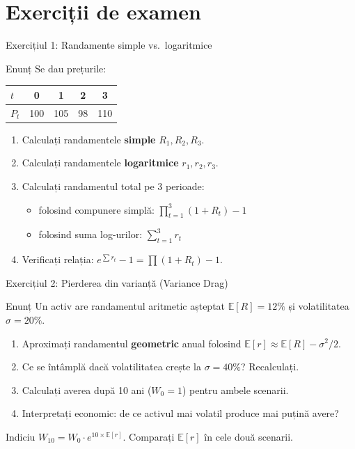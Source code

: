 \documentclass[9pt, aspectratio=169, t]{beamer}
\theoremstyle{definition}
\newcommand{\E}{\mathbb{E}}
\begin{document}
\section{Exerciții de examen}

\begin{frame}{Exercițiul 1: Randamente simple vs.\ logaritmice}
\begin{block}{Enunț}
Se dau prețurile:
\begin{center}
{\small
\renewcommand{\arraystretch}{1.2}
\begin{tabular}{lcccc}
\toprule
$t$ & 0 & 1 & 2 & 3 \\
\midrule
$P_t$ & 100 & 105 & 98 & 110 \\
\bottomrule
\end{tabular}
}
\end{center}
\end{block}
\begin{enumerate}
    \item Calculați randamentele \textbf{simple} $R_1, R_2, R_3$.
    \item Calculați randamentele \textbf{logaritmice} $r_1, r_2, r_3$.
    \item Calculați randamentul total pe 3 perioade:
    \begin{itemize}
        \item folosind compunere simplă: $\prod_{t=1}^{3}(1+R_t) - 1$
        \item folosind suma log-urilor: $\sum_{t=1}^{3} r_t$
    \end{itemize}
    \item Verificați relația: $e^{\sum r_t} - 1 = \prod(1+R_t) - 1$.
\end{enumerate}
\end{frame}

\begin{frame}{Exercițiul 2: Pierderea din varianță (Variance Drag)}
\begin{block}{Enunț}
Un activ are randamentul aritmetic așteptat $\E[R] = 12\%$ și volatilitatea $\sigma = 20\%$.
\end{block}
\begin{enumerate}
    \item Aproximați randamentul \textbf{geometric} anual folosind $\E[r] \approx \E[R] - \sigma^2/2$.
    \item Ce se întâmplă dacă volatilitatea crește la $\sigma = 40\%$? Recalculați.
    \item Calculați averea după 10 ani ($W_0 = 1$) pentru ambele scenarii.
    \item Interpretați economic: de ce activul mai volatil produce mai puțină avere?
\end{enumerate}
\vspace{0.1cm}
\begin{exampleblock}{Indiciu}
$W_{10} = W_0 \cdot e^{10 \times \E[r]}$. Comparați $\E[r]$ în cele două scenarii.
\end{exampleblock}
\end{frame}
\end{document}
